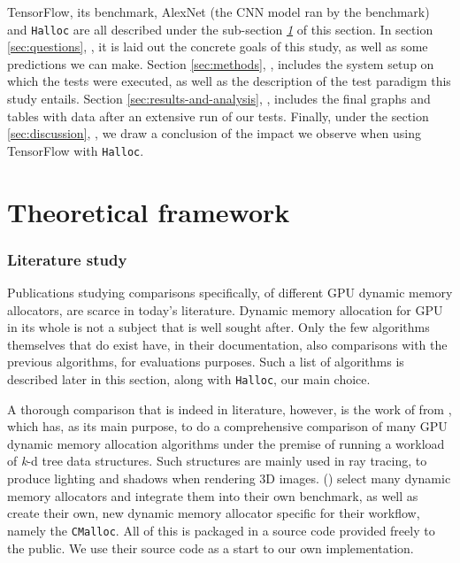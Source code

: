 \documentclass[12pt,twoside]{article}
\begin{document}
TensorFlow, its benchmark, AlexNet (the CNN model ran by the benchmark) and \texttt{Halloc} are all described under the sub-section \textit{\ref{sec:theoretical-framework} } of this \textit{} section. In section \ref{sec:questions}, \textit{}, it is laid out the concrete goals of this study, as well as some predictions we can make. Section \ref{sec:methods}, \textit{}, includes the system setup on which the tests were executed, as well as the description of the test paradigm this study entails. Section \ref{sec:results-and-analysis}, \textit{}, includes the final graphs and tables with data after an extensive run of our tests. Finally, under the section \ref{sec:discussion}, \textit{}, we draw a conclusion of the impact we observe when using TensorFlow with \texttt{Halloc}. 

\section{Theoretical framework}
\label{sec:theoretical-framework}

\subsubsection*{Literature study}

Publications studying comparisons specifically, of different GPU dynamic memory allocators, are scarce in today's literature. Dynamic memory allocation for GPU in its whole is not a subject that is well sought after. Only the few algorithms themselves that do exist have, in their documentation, also comparisons with the previous algorithms, for evaluations purposes. Such a list of algorithms is described later in this section, along with \texttt{Halloc}, our main choice.

A thorough comparison that is indeed in literature, however, is the work of \citeauthor{Vinkler2015} from \citeyear{Vinkler2015}, which has, as its main purpose, to do a comprehensive comparison of many GPU dynamic memory allocation algorithms under the premise of running a workload of \textit{k}-d tree data structures. Such structures are mainly used in ray tracing, to produce lighting and shadows when rendering 3D images. \citeauthor{Vinkler2015} (\citeyear{Vinkler2015}) select many dynamic memory allocators and integrate them into their own benchmark, as well as create their own, new dynamic memory allocator specific for their workflow, namely the \texttt{CMalloc}. All of this is packaged in a source code provided freely to the public. We use their source code as a start to our own implementation.
\end{document}
